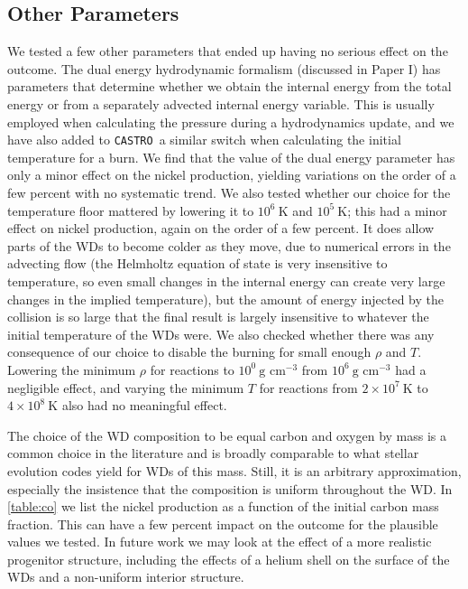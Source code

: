 \documentclass[twocolumn,numberedappendix]{../aastex6}
\newcommand{\castro}{\texttt{CASTRO}}
\begin{document}
\subsection{Other Parameters}

We tested a few other parameters that ended up having no serious effect on the outcome.
The dual energy hydrodynamic formalism (discussed in Paper I) has parameters that determine
whether we obtain the internal energy from the total energy or from a separately advected
internal energy variable. This is usually employed when calculating the pressure during
a hydrodynamics update, and we have also added to \castro\ a similar switch when calculating
the initial temperature for a burn. We find that the value of the dual energy parameter has
only a minor effect on the nickel production, yielding variations on the order of a few percent
with no systematic trend. We also tested whether our choice for the temperature floor mattered
by lowering it to $10^6\ \text{K}$ and $10^5\ \text{K}$; this had a minor effect on nickel
production, again on the order of a few percent. It does allow parts of the WDs to
become colder as they move, due to numerical errors in the advecting flow (the Helmholtz
equation of state is very insensitive to temperature, so even small changes in the internal
energy can create very large changes in the implied temperature), but the amount of energy
injected by the collision is so large that the final result is largely insensitive to whatever
the initial temperature of the
WDs were. We also checked whether there was any consequence of our choice to disable the
burning for small enough $\rho$ and $T$. Lowering the minimum $\rho$ for reactions to
$10^0\ \text{g cm}^{-3}$ from $10^6\ \text{g cm}^{-3}$ had a negligible effect,
and varying the minimum $T$ for reactions from $2 \times 10^{7}\ \text{K}$ to
$4 \times 10^{8}\ \text{K}$ also had no meaningful effect.


The choice of the WD composition to be equal carbon and oxygen by mass is a common
choice in the literature and is broadly comparable to what stellar evolution codes
yield for WDs of this mass. Still, it is an arbitrary approximation, especially the
insistence that the composition is uniform throughout the WD. In \autoref{table:co}
we list the nickel production as a function of the initial carbon mass fraction.
This can have a few percent impact on the outcome for the plausible values we tested.
In future work we may look at the effect of a more realistic progenitor structure,
including the effects of a helium shell on the surface of the WDs \citep{holcomb:2015}
and a non-uniform interior structure.
\end{document}
